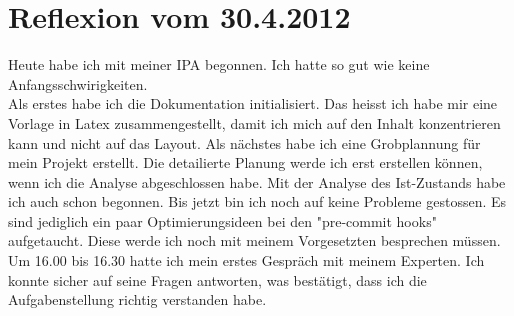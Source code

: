 \section{Reflexion vom 30.4.2012}

Heute habe ich mit meiner IPA begonnen. Ich hatte so gut wie keine Anfangsschwirigkeiten. \\
Als erstes habe ich die Dokumentation initialisiert. Das heisst ich habe mir eine Vorlage in Latex zusammengestellt, damit ich mich auf den Inhalt konzentrieren kann und nicht auf das Layout.
Als nächstes habe ich eine Grobplannung für mein Projekt erstellt. Die detailierte Planung werde ich erst erstellen können, wenn ich die Analyse abgeschlossen habe.
Mit der Analyse des Ist-Zustands habe ich auch schon begonnen. Bis jetzt bin ich noch auf keine Probleme gestossen. Es sind jediglich ein paar Optimierungsideen bei den "pre-commit hooks" aufgetaucht. Diese werde ich noch mit meinem Vorgesetzten besprechen müssen. \\ 
Um 16.00 bis 16.30 hatte ich mein erstes Gespräch mit meinem Experten. Ich konnte sicher auf seine Fragen antworten, was bestätigt, dass ich die Aufgabenstellung richtig verstanden habe. 

\clearpage

